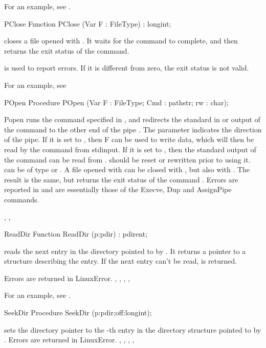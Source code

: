 For an example, see .

\begin{function}{PClose}
\Declaration
Function PClose (Var F : FileType) : longint;

\Description
  closes a file opened with . It waits for the
command to complete, and then returns the exit status of the command. 

\Errors
{} is used to report errors. If it is different from zero,
the exit status is not valid.
\SeeAlso
{}
\end{function}
For an example, see 
\begin{procedure}{POpen}
\Declaration
Procedure POpen (Var F : FileType; Cmd : pathstr; rw : char);

\Description
 Popen runs the command specified in ,
 and redirects the standard in or output of the
command to the other end of the pipe . The parameter 
indicates the direction of the pipe. If it is set to , then F can
be used to write data, which will then be read by the command from stdinput.
If it is set to , then the standard output of the command can be 
read from .  should be reset or rewritten prior to using it.
 can be of type  or .
A file opened with  can be closed with , but also
with . The result is the same, but  returns the
exit status of the command .
\Errors
Errors are reported in  and are essentially those of the
Execve, Dup and AssignPipe commands.

\SeeAlso
{}, , 
\end{procedure}
\begin{function}{ReadDir}
\Declaration
Function ReadDir (p:pdir) : pdirent;

\Description
{} reads the next entry in the directory pointed to by .
It returns a  pointer to a structure describing the entry.
If the next entry can't be read,  is returned.

\Errors
Errors are returned in LinuxError.
\SeeAlso
{}, , , ,
\end{function}
For an example, see .
\begin{procedure}{SeekDir}
\Declaration
Procedure SeekDir (p:pdir;off:longint);

\Description
  sets the directory pointer to the -th entry in the
directory structure pointed to by .
\Errors
Errors are returned in LinuxError.
\SeeAlso
{}, , , ,
\end{procedure}
